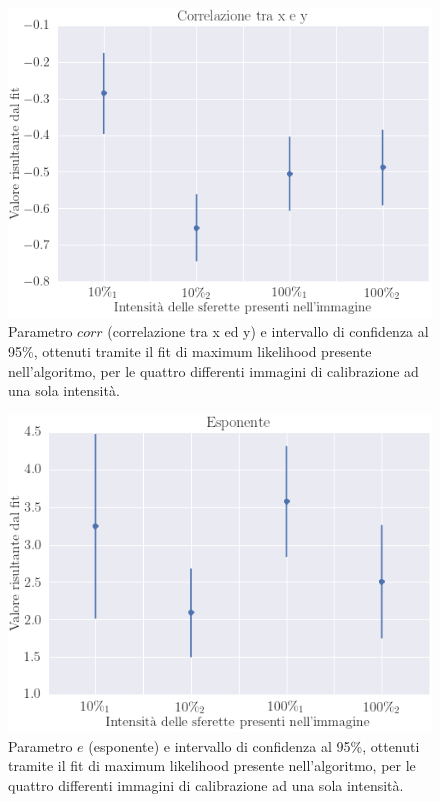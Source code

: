 \begin{figure}
 \centering
 \includegraphics[scale=.50]{img/CAP4corr.png}
 \caption{\small{Parametro $corr$ (correlazione tra x ed y) e intervallo di confidenza al 95\%, ottenuti tramite il fit di maximum likelihood presente nell'algoritmo, per le quattro differenti immagini di calibrazione ad una sola intensità.}}
 \label{fig:corr}
\end{figure}

\begin{figure}
 \centering
 \includegraphics[scale=.50]{img/CAP4e.png}
 \caption{\small{Parametro $e$ (esponente) e intervallo di confidenza al 95\%, ottenuti tramite il fit di maximum likelihood presente nell'algoritmo, per le quattro differenti immagini di calibrazione ad una sola intensità.}}
 \label{fig:e}
\end{figure}

